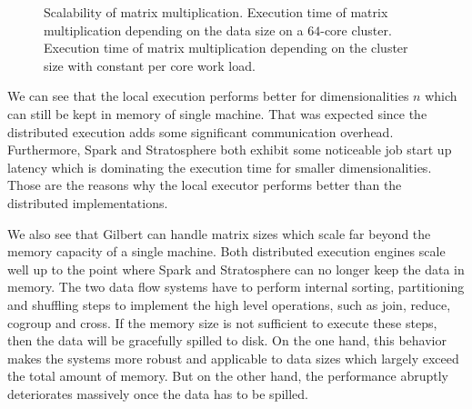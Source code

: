 \begin{figure}
	\centering
	\begin{subfigure}{\dualpgfwidth}
		\caption{}
		\label{fig:mmLoadRuntime}
	\end{subfigure}
	\begin{subfigure}{\dualpgfwidth}
		\caption{}
		\label{fig:mmNodesRuntime}
	\end{subfigure}
	\caption{Scalability of matrix multiplication.  Execution time of matrix multiplication depending on the data size on a $64$-core cluster.  Execution time of matrix multiplication depending on the cluster size with constant per core work load.}
	\label{fig:mmBenchmark}
\end{figure}

We can see that the local execution performs better for dimensionalities $n$ which can still be kept in memory of single machine.
That was expected since the distributed execution adds some significant communication overhead.
Furthermore, Spark and Stratosphere both exhibit some noticeable job start up latency which is dominating the execution time for smaller dimensionalities.
Those are the reasons why the local executor performs better than the distributed implementations.

We also see that Gilbert can handle matrix sizes which scale far beyond the memory capacity of a single machine.
Both distributed execution engines scale well up to the point where Spark and Stratosphere can no longer keep the data in memory.
The two data flow systems have to perform internal sorting, partitioning and shuffling steps to implement the high level operations, such as join, reduce, cogroup and cross.
If the memory size is not sufficient to execute these steps, then the data will be gracefully spilled to disk.
On the one hand, this behavior makes the systems more robust and applicable to data sizes which largely exceed the total amount of memory.
But on the other hand, the performance abruptly deteriorates massively once the data has to be spilled.

